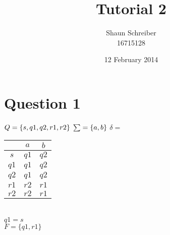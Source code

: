 \documentclass[a4paper, 10pt]{article}
\date{12 February 2014}
\author{Shaun Schreiber \\ 16715128}
\title{Tutorial 2}
\begin{document}
\maketitle
\section*{Question 1}
$Q = \{s, q1, q2, r1, r2\}\\$
$\sum = \{a, b\}\\$
$\delta =$
\begin{table}[h!t]
\centering
\begin{tabular}{c | c c}
 & $a$ & $b$ \\ 
\hline
$s$ & $q1$ & $q2$ \\
$q1$ & $q1$ & $q2$\\
$q2$ & $q1$ & $q2$\\
$r1$ & $r2$ & $r1$\\
$r2$ & $r2$ & $r1$\\
\end{tabular}
\end{table}\\
$q1 = s$\\
$F = \{q1, r1\}$
\end{document}
